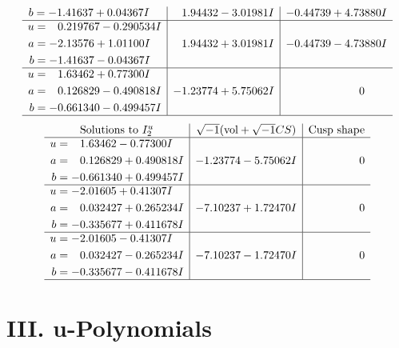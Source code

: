 \documentclass[1p]{elsarticle_modified}
\theoremstyle{definition}
\newcommand{\I}{\sqrt{-1}}
\begin{document}
$$\begin{array}{c|c|c}
\begin{aligned}
b &= -1.41637 + 0.04367 I\end{aligned}
 & \phantom{-}1.94432 - 3.01981 I & -0.44739 + 4.73880 I \\ \hline\begin{aligned}
u &= \phantom{-}0.219767 - 0.290534 I \\
a &= -2.13576 + 1.01100 I \\
b &= -1.41637 - 0.04367 I\end{aligned}
 & \phantom{-}1.94432 + 3.01981 I & -0.44739 - 4.73880 I \\ \hline\begin{aligned}
u &= \phantom{-}1.63462 + 0.77300 I \\
a &= \phantom{-}0.126829 - 0.490818 I \\
b &= -0.661340 - 0.499457 I\end{aligned}
 & -1.23774 + 5.75062 I & \phantom{-0.000000 } 0\\
 \hline 
 \end{array}$$\newpage$$\begin{array}{c|c|c}  
\text{Solutions to }I^u_{2}& \I (\text{vol} + \sqrt{-1}CS) & \text{Cusp shape}\\
 \hline 
\begin{aligned}
u &= \phantom{-}1.63462 - 0.77300 I \\
a &= \phantom{-}0.126829 + 0.490818 I \\
b &= -0.661340 + 0.499457 I\end{aligned}
 & -1.23774 - 5.75062 I & \phantom{-0.000000 } 0 \\ \hline\begin{aligned}
u &= -2.01605 + 0.41307 I \\
a &= \phantom{-}0.032427 + 0.265234 I \\
b &= -0.335677 + 0.411678 I\end{aligned}
 & -7.10237 + 1.72470 I & \phantom{-0.000000 } 0 \\ \hline\begin{aligned}
u &= -2.01605 - 0.41307 I \\
a &= \phantom{-}0.032427 - 0.265234 I \\
b &= -0.335677 - 0.411678 I\end{aligned}
 & -7.10237 - 1.72470 I & \phantom{-0.000000 } 0\\
 \hline 
 \end{array}$$\newpage
\newpage\renewcommand{\arraystretch}{1}
\centering \section*{ III. u-Polynomials}
\end{document}
